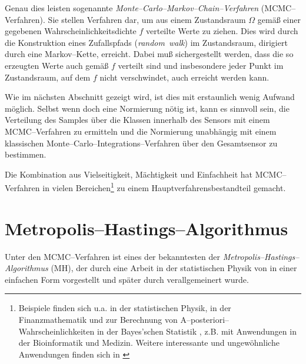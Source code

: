 	Genau dies leisten sogenannte {\em Mon\-te--Car\-lo--Mar\-kov--Chain--Ver\-fahr\-en} (MCMC--Verfahren). Sie stellen Verfahren dar, um aus einem Zustandsraum $\Omega$ gemäß einer gegebenen Wahrscheinlichkeitsdichte $f$ verteilte Werte zu ziehen. Dies wird durch die Konstruktion eines Zufallspfads ({\em random~walk}) im Zustandsraum, dirigiert durch eine Markov--Kette, erreicht. Dabei muß sichergestellt werden, dass die so erzeugten Werte auch gemäß $f$ verteilt sind und insbesondere jeder Punkt im Zustandsraum, auf dem $f$ nicht verschwindet, auch erreicht werden kann.
	
	Wie im nächsten Abschnitt gezeigt wird, ist dies mit erstaunlich wenig Aufwand möglich. Selbst wenn doch eine Normierung nötig ist, kann es sinnvoll sein, die Verteilung des Samples über die Klassen innerhalb des Sensors mit einem MCMC--Verfahren zu ermitteln und die Normierung unabhängig mit einem klassischen Monte--Carlo--Integrations--Verfahren über den Gesamtsensor zu bestimmen.
	
	Die Kombination aus Vielseitigkeit, Mächtigkeit und Einfachheit hat MCMC--Verfahren in vielen Bereichen\footnote{Beispiele finden sich u.a. in der statistischen Physik, in der Finanzmathematik und zur Berechnung von A--posteriori--Wahrscheinlichkeiten in der Bayes'schen Statistik \citep{Geweke:1989p10465}, z.B. mit Anwendungen in der Bioinformatik und Medizin. Weitere interessante und ungewöhnliche Anwendungen finden sich in \citep{Diaconis:2009p4122}} zu einem Hauptverfahrensbestandteil gemacht.
	
	
	\section{Metropolis--Hastings--Algorithmus}
	Unter den MCMC--Verfahren ist eines der bekanntesten der {\em Metropolis--Hastings--Algorithmus} (MH), der durch eine Arbeit in der statistischen Physik von \citet{Metropolis:1953p3364} in einer einfachen Form vorgestellt und später durch \citet{Hastings:1970p3387} verallgemeinert wurde.

